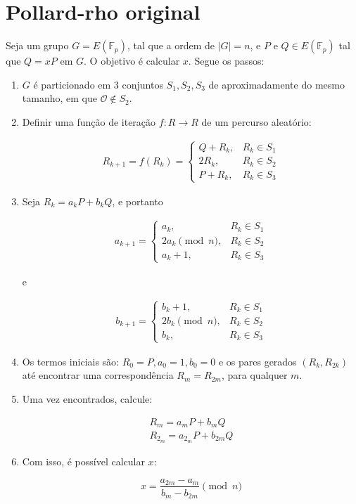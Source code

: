 \section{Pollard-rho original}
Seja um grupo $G = E(\mathbb{F}_p)$, tal que a ordem de $|G| = n$, e \(P\) e \(Q \in E(\mathbb{F}_p)\) tal que $Q = xP$ em \(G\). O objetivo é calcular \(x\). Segue os passos:

\begin{enumerate}
\item \(G\) é particionado em 3 conjuntos $S_1, S_2, S_3$ de aproximadamente do mesmo tamanho, em que $\mathcal{O} \notin S_2$.
\item Definir uma função de iteração $f : R \to R$ de um percurso aleatório:

\begin{eqnarray} \label{eq:walk}
R_{k+1} = f(R_k) =
\begin{cases}
Q + R_k, &R_k \in S_1 \\
2R_k, &R_k \in S_2 \\
P + R_k, &R_k \in S_3
\end{cases}
\end{eqnarray}

\item Seja $R_k = a_kP + b_kQ$, e portanto

\begin{eqnarray}
a_{k+1} =
\begin{cases}
a_k, &R_k \in S_1 \\
2a_k \pmod n, &R_k \in S_2 \\
a_k + 1, &R_k \in S_3
\end{cases}
\end{eqnarray}

e

\begin{eqnarray}
b_{k+1} =
\begin{cases}
b_k + 1, &R_k \in S_1 \\
2b_k \pmod n, &R_k \in S_2 \\
b_k, &R_k \in S_3
\end{cases}
\end{eqnarray}

\item Os termos iniciais são: $R_0 = P, a_0 = 1, b_0 = 0$ e os pares gerados $(R_k, R_{2k})$ até encontrar uma correspondência $R_m = R_{2m}$, para qualquer \(m\).

\item Uma vez encontrados, calcule:

\begin{eqnarray*}
R_m = a_mP + b_mQ \\
R_{2_m} = a_{2_m}P + b_{2m}Q
\end{eqnarray*}

\item Com isso, é possível calcular \(x\):

\begin{equation} \label{eq:x}
x = \frac{a_{2m} - a_m}{b_m - b_{2m}} \pmod n
\end{equation}

\end{enumerate}

